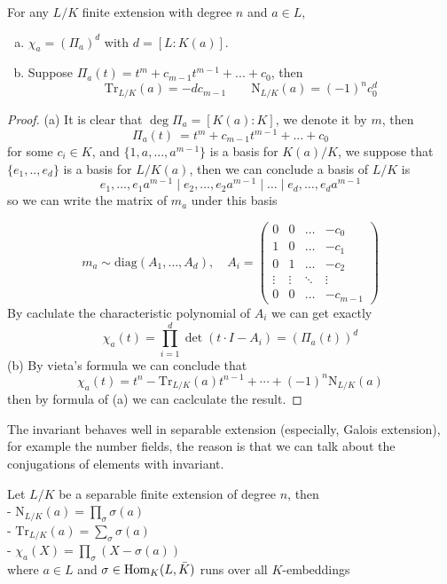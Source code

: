 \begin{colorproposition}
  For any \(L/K\) finite extension with degree \(n\) and \(a \in L\),
  \begin{enumerate}[(a)]
    \item \(\chi_a = (\Pi_a)^d\) with \(d = [L:K(a)]\).
    \item Suppose \(\Pi_a(t) = t^m + c_{m-1}t^{m-1}+...+c_0\), then \[\mathrm{Tr}_{L/K}(a) = -dc_{m-1} \qquad \mathrm{N}_{L/K}(a) = (-1)^{n}c_0^d\]
  \end{enumerate}
\end{colorproposition}

\begin{proof}
  (a) It is clear that \(\deg \Pi_a = [K(a):K]\), we denote it by \(m\), then 
  \[\Pi_a(t)\ = t^m + c_{m-1}t^{m-1}+...+c_0\]
  for some \(c_i \in K\), and \(\{1,a,...,a^{m-1}\}\) is a basis for \(K(a)/K\), we suppose that \(\{e_1,..,e_d\}\) is a basis for \(L/K(a)\), then we can conclude a basis of \(L/K\) is
  \[e_1,\dots,e_1a^{m-1} \mid e_2,\dots,e_2a^{m-1} \mid \dots \mid e_{d},\dots,e_da^{m-1}\]
  so we can write the matrix of \(m_a\) under this basis
  
  \[m_a \sim \mathrm{diag}(A_1,\dots,A_d), \quad A_i = \begin{pmatrix}
    0 & 0 & \dots & -c_0 \\
    1 & 0 & \dots & -c_1 \\
    0 & 1 & \dots & -c_2 \\
    \vdots & \vdots & \ddots & \vdots \\
    0 & 0 & \dots & -c_{m-1}
  \end{pmatrix}\]
  By caclulate the characteristic polynomial of \(A_i\) we can get exactly
  \[\chi_a(t) = \prod_{i = 1}^d \det(t\cdot I- A_i) = (\Pi_a(t))^d\]
  (b) By vieta's formula we can conclude that
  \[\chi_a(t) = t^{n} - \mathrm{Tr}_{L/K}(a)t^{n-1} + \cdots + (-1)^n\mathrm{N}_{L/K}(a)\]
  then by formula of (a) we can caclculate the result.
\end{proof}

The invariant behaves well in separable extension (especially, Galois extension), for example the number fields, the reason is that we can talk about the conjugations of elements with invariant.

\begin{colorproposition} \label{tracenormformule}
  Let \(L/K\) be a separable finite extension of degree \(n\), then \\

  - \(\mathrm{N}_{L/K}(a) = \prod_{\sigma} \sigma(a)\) \\

  - \(\mathrm{Tr}_{L/K}(a) = \sum_{\sigma} \sigma(a)\)\\

  - \(\chi_a(X) = \prod_{\sigma} (X - \sigma(a))\)\\
  where \(a \in L\) and \(\sigma \in \operatorname{Hom}_K(L,\bar{K})\) runs over all \(K\)-embeddings
\end{colorproposition}

